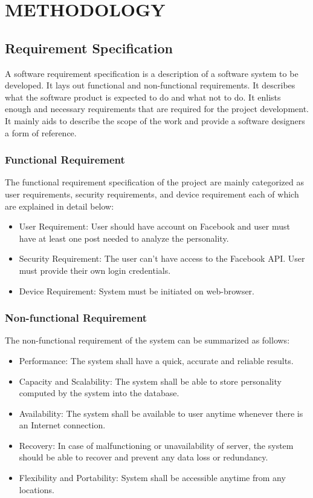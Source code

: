 \newpage
\section{METHODOLOGY}

\subsection{Requirement Specification}
A software requirement specification is a description of a software system to be developed. It lays out functional and non-functional requirements. It describes what the software product is expected to do and what not to do. It enlists enough and necessary requirements that are required for the project development. It mainly aids to describe the scope of the work and provide a software designers a form of reference.
\subsubsection{Functional Requirement}
The functional requirement specification of the project are mainly categorized as user requirements, security requirements, and device requirement each of which are explained in detail below:
\begin{itemize}
\item User Requirement: User should have account on Facebook and user must have at least one post needed to analyze the personality.
\item Security Requirement: The user can't have access to the Facebook API. User must provide their own login credentials.
\item Device Requirement: System must be initiated on web-browser.

\end{itemize}
\subsubsection{Non-functional Requirement}
The non-functional requirement of the system can be summarized as follows:
\begin{itemize}
\item Performance: The system shall have a quick, accurate and reliable results.
\item Capacity and Scalability: The system shall be able to store personality computed by the system into the database.
\item Availability: The system shall be available to user anytime whenever there is an Internet connection.
\item Recovery: In case of malfunctioning or unavailability of server, the system should be able to recover and prevent any data loss or redundancy.
\item Flexibility and Portability: System shall be accessible anytime from any locations.
\end{itemize}
